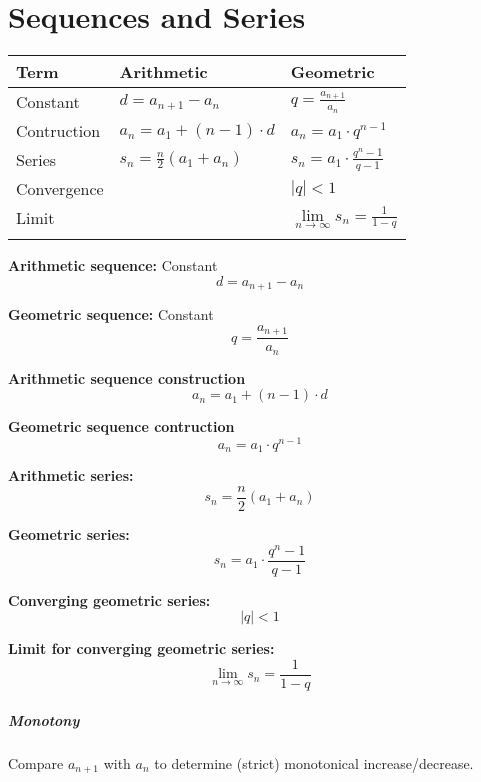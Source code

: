 \documentclass{book}
\begin{document}

\chapter{Sequences and Series}

\begin{tabular}{p{2.5cm}p{5.5cm}p{5.5cm}}
  \toprule
  \textbf{Term} & \textbf{Arithmetic} & \textbf{Geometric}\\
  \midrule
  Constant & $d = a_{n+1} - a_{n}$ & $q = \frac{a_{n+1}}{a_{n}}$ \\
  \midrule
  Contruction & $a_n = a_1 + (n-1) \cdot d$ & $a_n = a_1 \cdot q^{n-1}$ \\
  \midrule
  Series & $s_{n} = \frac{n}{2}\left(a_{1}+a_{n}\right)$ & $s_{n} = a_{1}\cdot\frac{q^{n}-1}{q-1}$ \\
  \midrule
  Convergence & & $|q| < 1$ \\
  \midrule
  Limit & & $\lim\limits_{n\to\infty}s_{n} = \frac{1}{1-q}$ \\
  \bottomrule\\
\end{tabular}

\textbf{Arithmetic sequence:} Constant
\[
  d = a_{n+1} - a_{n}
\]

\textbf{Geometric sequence:} Constant
\[
  q = \frac{a_{n+1}}{a_{n}}
\]

\textbf{Arithmetic sequence construction}
\[
  a_n = a_1 + (n-1) \cdot d
\]

\textbf{Geometric sequence contruction}
\[
  a_n = a_1 \cdot q^{n-1}
\]

\textbf{Arithmetic series:}
\[
  s_{n} = \frac{n}{2}\left(a_{1}+a_{n}\right)
\]

\textbf{Geometric series:}
\[
  s_{n} = a_{1}\cdot\frac{q^{n}-1}{q-1}
\]

\textbf{Converging geometric series:}
\[
  |q| < 1
\]

\textbf{Limit for converging geometric series:}
\[
  \lim\limits_{n\to\infty}s_{n} = \frac{1}{1-q}
\]

\paragraph{Monotony} Compare $a_{n+1}$ with $a_{n}$ to determine (strict) monotonical increase/decrease.
\end{document}
